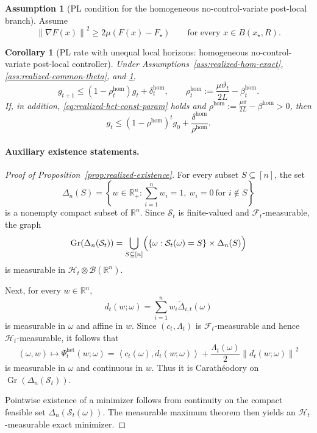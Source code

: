 \documentclass{article}
\newtheorem{corollary}[theorem]{Corollary}
\theoremstyle{definition}
\newtheorem{assumption}[theorem]{Assumption}
\newcommand{\RR}{\mathbb R}
\newcommand{\norm}[1]{\left\lVert #1\right\rVert}
\newcommand{\ip}[2]{\left\langle #1,#2\right\rangle}
\begin{document}
\begin{assumption}[PL condition for the homogeneous no-control-variate post-local branch]
\label{ass:realized-hom-PL}
Assume
\[
\norm{\nabla F(x)}^2\ge 2\mu(F(x)-F_\star)
\qquad
\text{for every }x\in B(x_\star,R).
\]
\end{assumption}

\begin{corollary}[PL rate with unequal local horizons: homogeneous no-control-variate post-local controller]

Under Assumptions~\ref{ass:realized-hom-exact}, \ref{ass:realized-common-theta}, and \ref{ass:realized-hom-PL},
\begin{equation}
g_{t+1}
\le
(1-\rho_t^{\mathrm{hom}})g_t+\delta_t^{\mathrm{hom}},
\qquad
\rho_t^{\mathrm{hom}}:=\frac{\mu\vartheta_t}{2L}-\beta_t^{\mathrm{hom}}.\end{equation}
If, in addition, \eqref{eq:realized-het-const-param} holds and $\rho^{\mathrm{hom}}
:=
\frac{\mu\vartheta}{2L}-\beta^{\mathrm{hom}}>0$,
then
\[
g_t
\le
(1-\rho^{\mathrm{hom}})^t g_0+\frac{\delta^{\mathrm{hom}}}{\rho^{\mathrm{hom}}}.
\]
\end{corollary}

\paragraph{Auxiliary existence statements.}

\begin{proof}[Proof of Proposition~\ref{prop:realized-existence}]
For every subset $S\subseteq[n]$, the set
\[
\Delta_n(S)
=
\left\{
w\in\RR^n_+:
\sum_{i=1}^n w_i=1,\ 
w_i=0 \ \text{for } i\notin S
\right\}
\]
is a nonempty compact subset of $\RR^n$. Since $\mathcal S_t$ is finite-valued and
$\mathcal F_t$-measurable, the graph
\[
\operatorname{Gr}(\Delta_n(\mathcal S_t))
=
\bigcup_{S\subseteq[n]}
\Bigl(
\{\omega:\mathcal S_t(\omega)=S\}\times \Delta_n(S)
\Bigr)
\]
is measurable in $\mathcal H_t\otimes \mathcal B(\RR^n)$.

Next, for every $w\in\RR^n$,
\[
d_t(w;\omega)=\sum_{i=1}^n w_i \widetilde\Delta_{i,t}(\omega)
\]
is measurable in $\omega$ and affine in $w$. Since $(c_t,\Lambda_t)$ is $\mathcal F_t$-measurable
and hence $\mathcal H_t$-measurable, it follows that
\[
(\omega,w)\mapsto
\Psi_t^{\mathrm{het}}(w;\omega)
=
\ip{c_t(\omega)}{d_t(w;\omega)}
+
\frac{\Lambda_t(\omega)}{2}\norm{d_t(w;\omega)}^2
\]
is measurable in $\omega$ and continuous in $w$. Thus it is Carath\'eodory on
$\operatorname{Gr}(\Delta_n(\mathcal S_t))$.

Pointwise existence of a minimizer follows from continuity on the compact feasible set
$\Delta_n(\mathcal S_t(\omega))$. The measurable maximum theorem then yields an
$\mathcal H_t$-measurable exact minimizer.
\end{proof}
\end{document}
